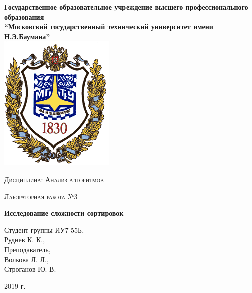 \documentclass[a4paper,12pt]{report}
\begin{document}
    \begin{titlepage}

        \begin{center}
            \large
            \textbf{Государственное образовательное учреждение высшего профессионального образования\\
            “Московский государственный технический университет имени Н.Э.Баумана”\\}
            \includegraphics{bmstu-logo.png}
			\vspace{1cm}
            
            \textsc{Дисциплина: Анализ алгоритмов}
            \vspace{0.5cm}
                
            \textsc{Лабораторная работа №3}
            \vspace{1cm}
            
            {\LARGE \textbf{Исследование сложности сортировок}}
            \vspace{3cm}
                    
            \begin{flushright}
            	Студент группы ИУ7-55Б,\\   
            	Руднев К. К.,\\
            	\vspace{0.5cm}
            	Преподаватель,\\
            	Волкова Л. Л.,\\
            	Строганов Ю. В.
            	
            \end{flushright}
            \vfill
            
            2019 г.
            
            \end{center}

    \end{titlepage}
\end{document}
